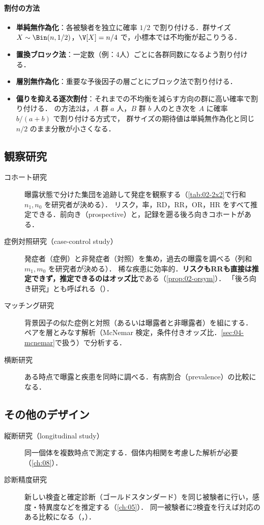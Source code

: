\paragraph{割付の方法}
\begin{itemize}
\item \textbf{単純無作為化}：各被験者を独立に確率 $1/2$ で割り付ける．群サイズ $X\sim\Bin(n,1/2)$，$\V[X]=n/4$ で，小標本では不均衡が起こりうる．
\item \textbf{置換ブロック法}：一定数（例：4人）ごとに各群同数になるよう割り付ける．
\item \textbf{層別無作為化}：重要な予後因子の層ごとにブロック法で割り付ける．
\item \textbf{偏りを抑える逐次割付}：それまでの不均衡を減らす方向の群に高い確率で割り付ける．
       の方法2は，$A$ 群 $a$ 人，$B$ 群 $b$ 人のとき次を $A$ に確率 $b/(a+b)$ で割り付ける方式で，
      群サイズの期待値は単純無作為化と同じ $n/2$ のまま分散が小さくなる．
\end{itemize}

\subsection{観察研究}\label{subsec:02-obs}
\begin{description}
\item[コホート研究] 曝露状態で分けた集団を追跡して発症を観察する（\cref{tab:02-2x2}で行和 $n_1,n_0$ を研究者が決める）．
      リスク，率，RD，RR，OR，HR をすべて推定できる．前向き（prospective）と，記録を遡る後ろ向きコホートがある．
\item[症例対照研究（case-control study）] 発症者（症例）と非発症者（対照）を集め，過去の曝露を調べる（列和 $m_1,m_0$ を研究者が決める）．
      稀な疾患に効率的．\textbf{リスクもRRも直接は推定できず，推定できるのはオッズ比}である（\cref{prop:02-orsym}）．
      「後ろ向き研究」とも呼ばれる（）．
\item[マッチング研究] 背景因子の似た症例と対照（あるいは曝露者と非曝露者）を組にする．
      ペアを層とみなす解析（McNemar 検定，条件付きオッズ比．\cref{sec:04-mcnemar}で扱う）で分析する．
\item[横断研究] ある時点で曝露と疾患を同時に調べる．有病割合（prevalence）の比較になる．
\end{description}

\subsection{その他のデザイン}
\begin{description}
\item[縦断研究（longitudinal study）] 同一個体を複数時点で測定する．個体内相関を考慮した解析が必要（\cref{ch:08}）．
\item[診断精度研究] 新しい検査と確定診断（ゴールドスタンダード）を同じ被験者に行い，感度・特異度などを推定する（\cref{ch:05}）．
      同一被験者に2検査を行えば対応のある比較になる（，）．
\end{description}


